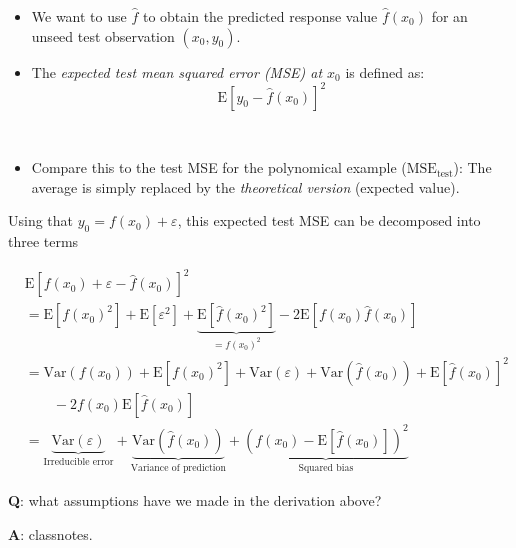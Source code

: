 \documentclass[ignorenonframetext,]{beamer}
\providecommand{\tightlist}{%
  \setlength{\itemsep}{0pt}\setlength{\parskip}{0pt}}
\begin{document}
\begin{frame}

\begin{itemize}
\item
  We want to use \(\hat{f}\) to obtain the predicted response value
  \(\hat{f}(x_0)\) for an unseed test observation \((x_0,y_0)\).
\item
  The \emph{expected test mean squared error (MSE) at \(x_0\)} is
  defined as: \[\text{E}[y_0 - \hat{f}(x_0)]^2\]
\end{itemize}

\(~\)

\begin{itemize}
\tightlist
\item
  Compare this to the test MSE for the polynomical example
  (\(\text{MSE}_{\text{test}}\)): The average is simply replaced by the
  \emph{theoretical version} (expected value).
\end{itemize}

\end{frame}

\begin{frame}

Using that \(y_0=f(x_0)+\varepsilon\), this expected test MSE can be
decomposed into three terms

\begin{align*}
& \text{E}[f(x_0)+\varepsilon - \hat{f}(x_0)]^2  \\
&= \text{E}[f(x_0)^2] +\text{E}[\varepsilon^2] + \underbrace{\text{E}[\hat{f}(x_0)^2]}_{=f(x_0)^2} -2\text{E}[f(x_0)\hat{f}(x_0)] \\
&= \text{Var}(f(x_0)) + \text{E}[f(x_0)^2] + \text{Var}(\varepsilon) + \text{Var}(\hat{f}(x_0)) +  \text{E}[\hat{f}(x_0)]^2 \\
& \qquad -2 f(x_0)\text{E}[\hat{f}(x_0)] \\
& =  \underbrace{\text{Var}(\varepsilon)}_{\text{Irreducible error}} + \underbrace{\text{Var}(\hat{f}(x_0))}_{\text{Variance of prediction}} + \underbrace{\left( f(x_0) - \text{E}[\hat{f}(x_0)] \right)^2}_{\text{Squared bias}}
\end{align*}

\textbf{Q}: what assumptions have we made in the derivation above?

\textbf{A}: classnotes.

\end{frame}
\end{document}
